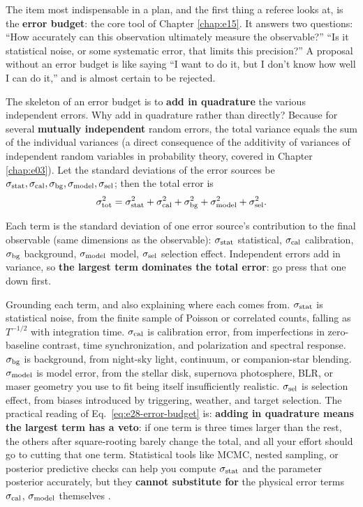 The item most indispensable in a plan, and the first thing a referee looks at, is the \textbf{error budget}: the core tool of Chapter \ref{chap:e15}. It answers two questions: ``How accurately can this observation ultimately measure the observable?'' ``Is it statistical noise, or some systematic error, that limits this precision?'' A proposal without an error budget is like saying ``I want to do it, but I don't know how well I can do it,'' and is almost certain to be rejected.

The skeleton of an error budget is to \textbf{add in quadrature} the various independent errors. Why add in quadrature rather than directly? Because for several \textbf{mutually independent} random errors, the total variance equals the sum of the individual variances (a direct consequence of the additivity of variances of independent random variables in probability theory, covered in Chapter \ref{chap:e03}). Let the standard deviations of the error sources be \(\sigma_{\rm stat},\sigma_{\rm cal},\sigma_{\rm bg},\sigma_{\rm model},\sigma_{\rm sel}\); then the total error is
\begin{equation}
  \sigma_{\rm tot}^2
  =
  \sigma_{\rm stat}^2
  +\sigma_{\rm cal}^2
  +\sigma_{\rm bg}^2
  +\sigma_{\rm model}^2
  +\sigma_{\rm sel}^2 .
  \label{eq:e28-error-budget}
\end{equation}
\begin{formulaexplain}
Each term is the standard deviation of one error source's contribution to the final observable (same dimensions as the observable): \(\sigma_{\rm stat}\) statistical, \(\sigma_{\rm cal}\) calibration, \(\sigma_{\rm bg}\) background, \(\sigma_{\rm model}\) model, \(\sigma_{\rm sel}\) selection effect. Independent errors add in variance, so \textbf{the largest term dominates the total error}: go press that one down first.
\end{formulaexplain}
Grounding each term, and also explaining where each comes from. \(\sigma_{\rm stat}\) is statistical noise, from the finite sample of Poisson or correlated counts, falling as \(T^{-1/2}\) with integration time. \(\sigma_{\rm cal}\) is calibration error, from imperfections in zero-baseline contrast, time synchronization, and polarization and spectral response. \(\sigma_{\rm bg}\) is background, from night-sky light, continuum, or companion-star blending. \(\sigma_{\rm model}\) is model error, from the stellar disk, supernova photosphere, BLR, or maser geometry you use to fit being itself insufficiently realistic. \(\sigma_{\rm sel}\) is selection effect, from biases introduced by triggering, weather, and target selection. The practical reading of Eq.\ \eqref{eq:e28-error-budget} is: \textbf{adding in quadrature means the largest term has a veto}: if one term is three times larger than the rest, the others after square-rooting barely change the total, and all your effort should go to cutting that one term. Statistical tools like MCMC, nested sampling, or posterior predictive checks can help you compute \(\sigma_{\rm stat}\) and the parameter posterior accurately, but they \textbf{cannot substitute for} the physical error terms \(\sigma_{\rm cal}\), \(\sigma_{\rm model}\) themselves \citep{2013PASP..125..306F,2009MNRAS.398.1601F,1979ApJ...228..939C,2013ApJ...764..167S}.

